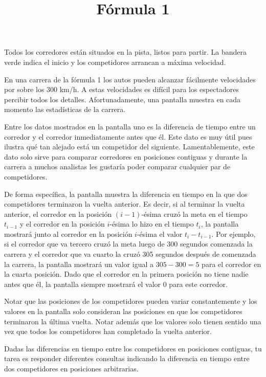 \documentclass{oci}
\title{Fórmula 1}
\begin{document}
\begin{problemDescription}
  Todos los corredores están situados en la pista, listos para partir.
  La bandera verde indica el inicio y los competidores arrancan a máxima velocidad.

  En una carrera de la fórmula 1 los autos pueden alcanzar fácilmente velocidades por sobre los 300 km/h.
  A estas velocidades es difícil para los espectadores percibir todos los detalles.
  Afortunadamente, una pantalla muestra en cada momento las estadísticas de la carrera.

  Entre los datos mostrados en la pantalla uno es la diferencia de tiempo entre un corredor y el
  corredor inmediatamente antes que él.
  Este dato es muy útil pues ilustra qué tan alejado está un competidor del siguiente.
  Lamentablemente, este dato solo sirve para comparar corredores en posiciones contiguas y durante
  la carrera a muchos analistas les gustaría poder comparar cualquier par de competidores.

  De forma específica, la pantalla muestra la diferencia en tiempo en la que dos competidores
  terminaron la vuelta anterior.
  Es decir, si al terminar la vuelta anterior, el corredor en la posición $(i-1)$-ésima cruzó la
  meta en el tiempo $t_{i-1}$ y el corredor en la posición $i$-ésima lo hizo en el tiempo $t_{i}$,
  la pantalla mostrará junto al corredor en la posición $i$-ésima el valor $t_{i} - t_{i-1}$.
  Por ejemplo, si el corredor que va tercero cruzó la meta luego de 300 segundos
  comenzada la carrera y el corredor que va cuarto la cruzó 305 segundos después de comenzada la
  carrera, la pantalla mostrará un valor igual a $305-300=5$ para el corredor en la cuarta posición.
  Dado que el corredor en la primera posición no tiene nadie antes que él, la pantalla siempre mostrará
  el valor 0 para este corredor.

  Notar que las posiciones de los competidores pueden variar constantemente y los valores en la
  pantalla solo consideran las posiciones en que los competidores terminaron la última vuelta.
  Notar además que los valores solo tienen sentido una vez que todos los competidores han completado
  la vuelta anterior.

  Dadas las diferencias en tiempo entre los competidores en posiciones contiguas, tu tarea es
  responder diferentes consultas indicando la diferencia en tiempo entre dos competidores en
  posiciones arbitrarias.
\end{problemDescription}
\end{document}

